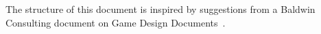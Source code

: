 The structure of this document is inspired by suggestions from a Baldwin Consulting document on Game Design Documents~\cite{BaldwinGDD}.
